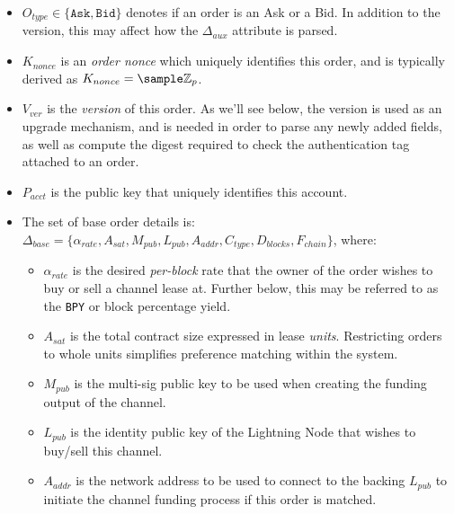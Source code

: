 \documentclass[10pt,a4paper]{article}
\theoremstyle{definition}
\begin{document}
\begin{itemize}
    \item $O_{type} \in \{\texttt{Ask}, \texttt{Bid}\}$ denotes if an order is
        an Ask or a Bid. In addition to the version, this may affect how the
        $\Delta_{aux}$ attribute is parsed.

    \item $K_{nonce}$ is an \emph{order nonce} which uniquely identifies this
        order, and is typically derived as $K_{nonce} = \sample
        \mathbb{Z}_{p}$.

    \item $V_{ver}$ is the \emph{version} of this order. As we'll see below,
        the version is used as an upgrade mechanism, and is needed in order to
        parse any newly added fields, as well as compute the digest required to
        check the authentication tag attached to an order.

    \item $P_{acct}$ is the public key that uniquely identifies this account.

    \item The set of base order details is: \\ $\Delta_{base} = \{
        \alpha_{rate}, A_{sat}, M_{pub}, L_{pub}, A_{addr}, C_{type},
    D_{blocks}, F_{chain} \}$, where:

    \begin{itemize}

        \item $\alpha_{rate}$ is the desired \emph{per-block} rate that the
            owner of the order wishes to buy or sell a channel lease at.
            Further below, this may be referred to as the \texttt{BPY} or block
            percentage yield.

        \item $A_{sat}$ is the total contract size expressed in lease
            \emph{units}.  Restricting orders to whole units simplifies
            preference matching within the system.

        \item $M_{pub}$ is the multi-sig public key to be used when creating
            the funding output of the channel. %

        \item $L_{pub}$ is the identity public key of the Lightning
            Node that wishes to buy/sell this channel.

        \item $A_{addr}$ is the network address to be used to connect to the
            backing $L_{pub}$ to initiate the channel funding process if this
            order is matched. %


\end{itemize}
\end{itemize}
\end{document}
